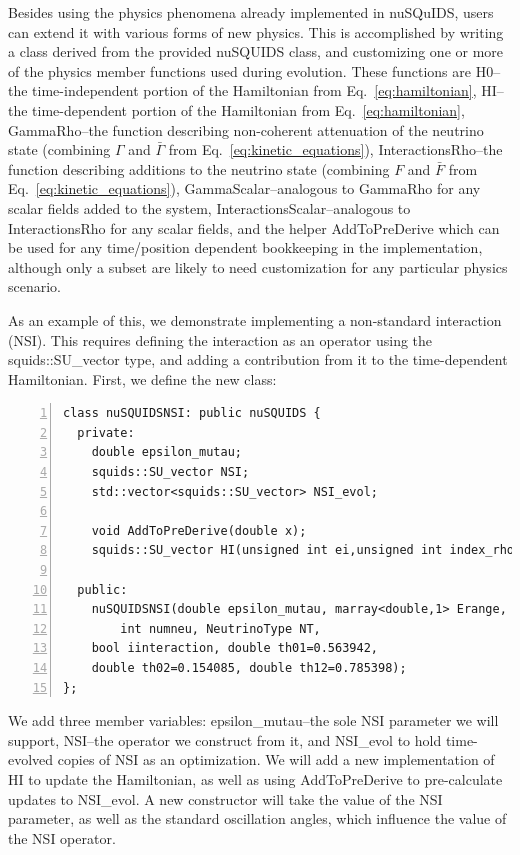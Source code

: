 \documentclass[3p,12pt]{elsarticle}
\newcommand{\ttf}{\ttfamily}
\begin{document}
Besides using the physics phenomena already implemented in {\ttf nuSQuIDS}, users can extend it with various forms of new physics. 
This is accomplished by writing a class derived from the provided {\ttf nuSQUIDS} class, and customizing one or more of the physics member functions used during evolution. 
These functions are {\ttf H0}--the time-independent portion of the Hamiltonian from Eq.~\ref{eq:hamiltonian}, {\ttf HI}--the time-dependent portion of the Hamiltonian from Eq.~\ref{eq:hamiltonian}, {\ttf GammaRho}--the function describing non-coherent attenuation of the neutrino state (combining $\Gamma$ and $\bar\Gamma$ from Eq.~\ref{eq:kinetic_equations}), {\ttf InteractionsRho}--the function describing additions to the neutrino state (combining $F$ and $\bar F$ from Eq.~\ref{eq:kinetic_equations}), {\ttf GammaScalar}--analogous to {\ttf GammaRho} for any scalar fields added to the system, {\ttf InteractionsScalar}--analogous to {\ttf InteractionsRho} for any scalar fields, and the helper {\ttf AddToPreDerive} which can be used for any time/position dependent bookkeeping in the implementation, although only a subset are likely to need customization for any particular physics scenario. 

As an example of this, we demonstrate implementing a non-standard interaction (NSI). 
This requires defining the interaction as an operator using the {\ttf squids::SU\_vector} type, and adding a contribution from it to the time-dependent Hamiltonian. 
First, we define the new class:
\begin{lstlisting}[frame=leftline, numbers = left,breaklines=true]
class nuSQUIDSNSI: public nuSQUIDS {
  private:
    double epsilon_mutau;
    squids::SU_vector NSI;
    std::vector<squids::SU_vector> NSI_evol;
    
    void AddToPreDerive(double x);
    squids::SU_vector HI(unsigned int ei,unsigned int index_rho) const;

  public:
    nuSQUIDSNSI(double epsilon_mutau, marray<double,1> Erange, 
        int numneu, NeutrinoType NT,
	bool iinteraction, double th01=0.563942, 
	double th02=0.154085, double th12=0.785398);
};
\end{lstlisting}
We add three member variables: {\ttf epsilon\_mutau}--the sole NSI parameter we will support, {\ttf NSI}--the operator we construct from it, and {\ttf NSI\_evol} to hold time-evolved copies of {\ttf NSI} as an optimization. 
We will add a new implementation of {\ttf HI} to update the Hamiltonian, as well as using {\ttf AddToPreDerive} to pre-calculate updates to {\ttf NSI\_evol}. 
A new constructor will take the value of the NSI parameter, as well as the standard oscillation angles, which influence the value of the NSI operator. 
\end{document}
